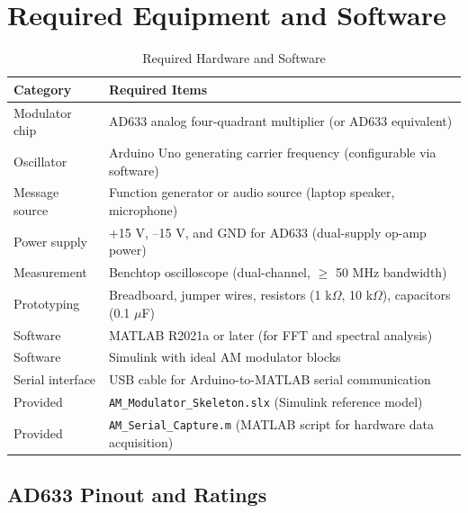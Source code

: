 \documentclass[11pt,letterpaper]{article}
\begin{document}
\clearpage

\section{Required Equipment and Software}

\begin{table}[H]
    \centering
    \caption{Required Hardware and Software}
    \label{tab:equipment}
    \begin{tabularx}{\linewidth}{l X}
    \toprule
    \textbf{Category} & \textbf{Required Items}\\
    \midrule
    Modulator chip & AD633 analog four-quadrant multiplier (or AD633 equivalent)\\
    Oscillator & Arduino Uno generating carrier frequency (configurable via software)\\
    Message source & Function generator or audio source (laptop speaker, microphone)\\
    Power supply & +15 V, --15 V, and GND for AD633 (dual-supply op-amp power)\\
    Measurement & Benchtop oscilloscope (dual-channel, $\geq$ 50 MHz bandwidth)\\
    Prototyping & Breadboard, jumper wires, resistors (1 k$\Omega$, 10 k$\Omega$), capacitors (0.1 $\mu$F)\\
    Software & MATLAB R2021a or later (for FFT and spectral analysis)\\
    Software & Simulink with ideal AM modulator blocks\\
    Serial interface & USB cable for Arduino-to-MATLAB serial communication\\
    Provided & \texttt{AM\_Modulator\_Skeleton.slx} (Simulink reference model)\\
    Provided & \texttt{AM\_Serial\_Capture.m} (MATLAB script for hardware data acquisition)\\
    \bottomrule
    \end{tabularx}
\end{table}

\subsection*{AD633 Pinout and Ratings}
\end{document}
